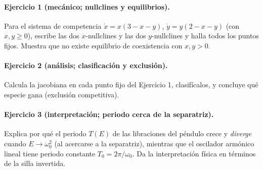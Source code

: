 \paragraph{Ejercicio 1 (mecánico; nullclines y equilibrios).} Para el sistema de competencia $\dot{x}=x(3-x-y)$, $\dot{y}=y(2-x-y)$ (con $x,y\ge 0$), escribe las dos $x$-nullclines y las dos $y$-nullclines y halla todos los puntos fijos. Muestra que no existe equilibrio de coexistencia con $x,y>0$.

\paragraph{Ejercicio 2 (análisis; clasificación y exclusión).} Calcula la jacobiana en cada punto fijo del Ejercicio 1, clasifícalos, y concluye qué especie gana (exclusión competitiva).

\paragraph{Ejercicio 3 (interpretación; periodo cerca de la separatriz).} Explica por qué el periodo $T(E)$ de las libraciones del péndulo crece y \emph{diverge} cuando $E\to\omega_0^2$ (al acercarse a la separatriz), mientras que el oscilador armónico lineal tiene periodo constante $T_0=2\pi/\omega_0$. Da la interpretación física en términos de la silla invertida.
